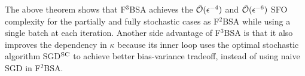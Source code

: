 {The above theorem shows that F${}^3$BSA achieves the $\tilde {{\mathcal{O}}}(\epsilon^{-4})$ and $\tilde {{\mathcal{O}}}(\epsilon^{-6})$ SFO complexity for the partially and fully stochastic cases as F${}^2$BSA while using a single batch at each iteration. 
Another side advantage of F${}^3$BSA is that it also improves the dependency in $\kappa$ because its inner loop uses the optimal stochastic algorithm SGD${}^{\rm SC}$ \citep[Algorithm 2]{allen2018make} to achieve better bias-variance tradeoff, instead of using naive SGD in F${}^2$BSA.








}
